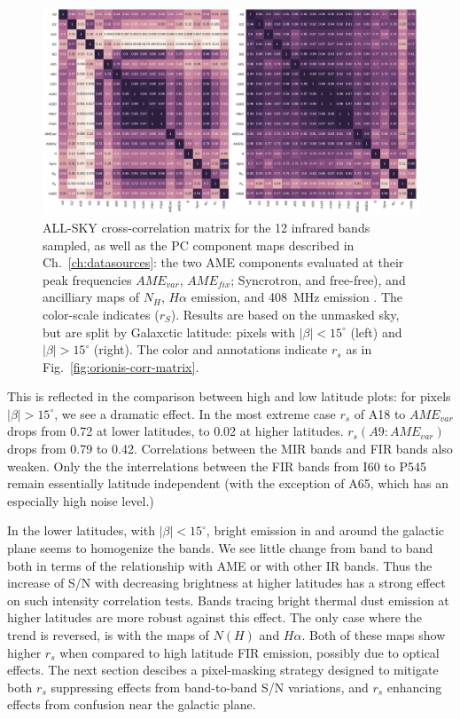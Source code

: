           \begin{figure}
            \includegraphics[width=\textwidth]{../Plots/ch_allsky/all_bands_corr_matrix_wAME_spearmanintensity_unmasked.pdf}
            \centering
            \caption{ALL-SKY cross-correlation matrix for the 12 infrared bands sampled, as well as the PC component maps described in Ch.~\ref{ch:datasources}: the two AME components evaluated at their peak frequencies $AME_{var}$, $AME_{fix}$; Syncrotron, and free-free), and ancilliary maps of $N_{H}$, $H{\alpha}$ emission, and 408~MHz emission \cite{haslam82}. The color-scale indicates ($r_{S}$). Results are based on the unmasked sky, but are split by Galaxctic latitude: pixels with $|\beta{}| < 15^{\circ}$ (left) and $|\beta{}| > 15^{\circ}$ (right). The color and annotations indicate $r_{s}$ as in Fig.~\ref{fig:orionis-corr-matrix}. }
            \label{fig:all_bands_corr_matrix_wAME_spearman}
          \end{figure}
       This is reflected in the comparison between high and low latitude plots: for pixels $|\beta| > 15 ^{\circ}$, we see a dramatic effect. In the most extreme case $r_{s}$ of A18 to $AME_{var}$ drops from 0.72 at lower latitudes, to 0.02 at higher latitudes. $r_{s}(A9:AME_{var})$ drops from 0.79 to 0.42. Correlations between the MIR bands and FIR bands also weaken. Only the the interrelations between the FIR bands from I60 to P545 remain essentially latitude independent (with the exception of A65, which has an especially high noise level.)

        In the lower latitudes, with $|\beta| < 15^{\circ}$, bright emission in and around the galactic plane seems to homogenize the bands. We see little change from band to band both in terms of the relationship with AME or with other IR bands. Thus the increase of S/N with decreasing brightness at higher latitudes has a strong effect on such intensity correlation tests. Bands tracing bright thermal dust emission at higher latitudes are more robust against this effect. The only case where the trend is reversed, is with the maps of $N(H)$ and $H{\alpha}$. Both of these maps show higher $r_{s}$ when compared to high latitude FIR emission, possibly due to optical effects. The next section descibes a pixel-masking strategy designed to mitigate both $r_{s}$ suppressing effects from band-to-band S/N variations, and $r_{s}$ enhancing effects from confusion near the galactic plane.

